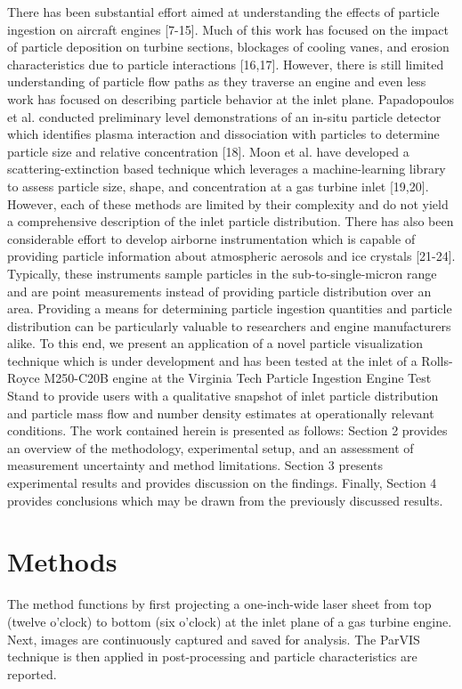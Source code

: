 \documentclass[12pt]{iopart}
\begin{document}
There has been substantial effort aimed at understanding the effects of particle ingestion on aircraft engines [7-15]. Much of this work has focused on the impact of particle deposition on turbine sections, blockages of cooling vanes, and erosion characteristics due to particle interactions [16,17]. However, there is still limited understanding of particle flow paths as they traverse an engine and even less work has focused on describing particle behavior at the inlet plane. Papadopoulos et al. conducted preliminary level demonstrations of an in-situ particle detector which identifies plasma interaction and dissociation with particles to determine particle size and relative concentration [18]. Moon et al. have developed a scattering-extinction based technique which leverages a machine-learning library to assess particle size, shape, and concentration at a gas turbine inlet [19,20]. However, each of these methods are limited by their complexity and do not yield a comprehensive description of the inlet particle distribution. There has also been considerable effort to develop airborne instrumentation which is capable of providing particle information about atmospheric aerosols and ice crystals [21-24]. Typically, these instruments sample particles in the sub-to-single-micron range and are point measurements instead of providing particle distribution over an area. Providing a means for determining particle ingestion quantities and particle distribution can be particularly valuable to researchers and engine manufacturers alike. To this end, we present an application of a novel particle visualization technique which is under development and has been tested at the inlet of a Rolls-Royce M250-C20B engine at the Virginia Tech Particle Ingestion Engine Test Stand to provide users with a qualitative snapshot of inlet particle distribution and particle mass flow and number density estimates at operationally relevant conditions. The work contained herein is presented as follows: Section 2 provides an overview of the methodology, experimental setup, and an assessment of measurement uncertainty and method limitations. Section 3 presents experimental results and provides discussion on the findings. Finally, Section 4 provides conclusions which may be drawn from the previously discussed results.   
\section{Methods}
The method functions by first projecting a one-inch-wide laser sheet from top (twelve o’clock) to bottom (six o’clock) at the inlet plane of a gas turbine engine. Next, images are continuously captured and saved for analysis. The ParVIS technique is then applied in post-processing and particle characteristics are reported.
\end{document}
